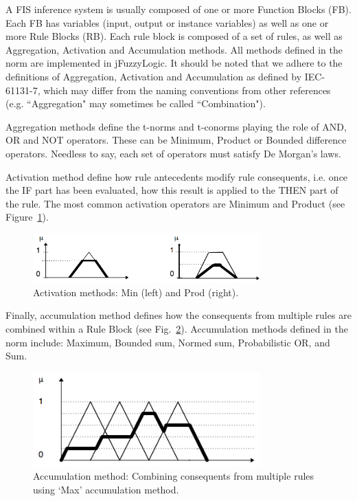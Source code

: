 \documentclass[conference]{IEEEtran}
\begin{document}
A FIS inference system is usually composed of one or more Function Blocks (FB). 
Each FB has variables (input, output or instance variables) as well as one or more Rule Blocks (RB). 
Each rule  block is composed of a set of rules, as well as Aggregation, Activation and Accumulation methods. 
All methods defined in the norm are implemented in jFuzzyLogic. 
It should be noted that we adhere to the definitions of Aggregation, Activation and Accumulation as defined by IEC-61131-7, which may differ from the naming conventions from other references (e.g. ``Aggregation" may sometimes be called ``Combination").

Aggregation methods define the t-norms and t-conorms playing the role of AND, OR and NOT operators.
These can be Minimum, Product or Bounded difference operators.
Needless to say, each set of operators must satisfy De Morgan’s laws.

Activation method define how rule antecedents modify rule consequents, i.e. once the IF part has been evaluated, how this result is applied to the THEN part of the rule.  
The most common activation operators are Minimum and Product (see Figure~\ref{f:activation}).

\begin{figure}[!t]
\centering
\includegraphics[width=3.45in]{figs/MaxProd.png}
\caption{Activation methods: Min (left) and Prod (right).}
\label{f:activation}
\end{figure}

Finally, accumulation method defines how the consequents from multiple rules are combined within a Rule Block (see Fig.~\ref{f:acumulation}).
Accumulation methods defined in the norm include:  Maximum, Bounded sum, Normed sum, Probabilistic OR, and Sum.

\begin{figure}[!t]
\centering
\includegraphics[width=3.45in]{figs/accumulation.png}
\caption{Accumulation method: Combining consequents from multiple rules using ‘Max’ accumulation method.}
\label{f:acumulation}
\end{figure}
\end{document}
